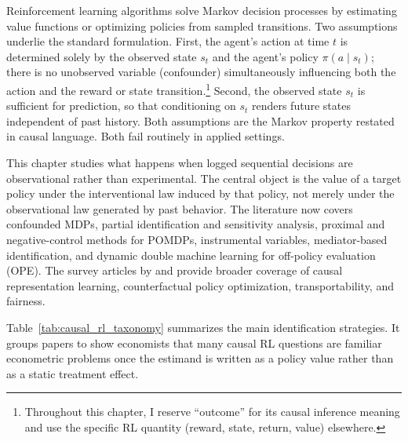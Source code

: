%

Reinforcement learning algorithms solve Markov decision processes by estimating value functions or optimizing policies from sampled transitions. Two assumptions underlie the standard formulation. First, the agent's action at time $t$ is determined solely by the observed state $s_t$ and the agent's policy $\pi(a \mid s_t)$; there is no unobserved variable (confounder) simultaneously influencing both the action and the reward or state transition.\footnote{Throughout this chapter, I reserve ``outcome'' for its causal inference meaning and use the specific RL quantity (reward, state, return, value) elsewhere.}
Second, the observed state $s_t$ is sufficient for prediction, so that conditioning on $s_t$ renders future states independent of past history. Both assumptions are the Markov property restated in causal language. Both fail routinely in applied settings.

This chapter studies what happens when logged sequential decisions are observational rather than experimental. The central object is the value of a target policy under the interventional law induced by that policy, not merely under the observational law generated by past behavior. The literature now covers confounded MDPs, partial identification and sensitivity analysis, proximal and negative-control methods for POMDPs, instrumental variables, mediator-based identification, and dynamic double machine learning for off-policy evaluation (OPE). The survey articles by \citet{deng2023causal} and \citet{dacostacunha2025unifying} provide broader coverage of causal representation learning, counterfactual policy optimization, transportability, and fairness.

Table~\ref{tab:causal_rl_taxonomy} summarizes the main identification strategies. It groups papers to show economists that many causal RL questions are familiar econometric problems once the estimand is written as a policy value rather than as a static treatment effect.

